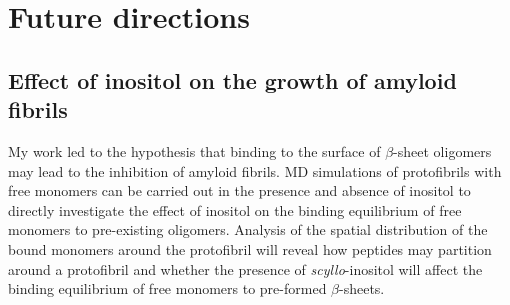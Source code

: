 



\section{Future directions}


\subsection{Effect of inositol on the growth of amyloid fibrils}
My work led to the hypothesis that binding to the surface of $\beta$-sheet oligomers may lead to the inhibition of amyloid fibrils.  MD simulations of protofibrils with free monomers can be carried out in the presence and absence of inositol to directly investigate the effect of inositol on the binding equilibrium of free monomers to pre-existing oligomers.  Analysis of the spatial distribution of the bound monomers around the protofibril will reveal how peptides may partition around a protofibril and whether the presence of \textit{scyllo}-inositol will affect the binding equilibrium of free monomers to pre-formed $\beta$-sheets. %

